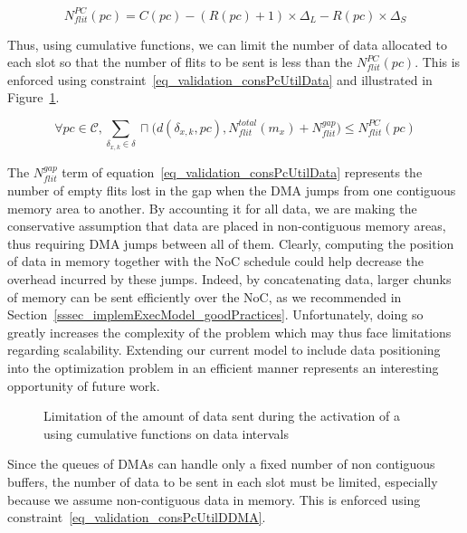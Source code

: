\documentclass[main.tex]{subfiles}
\begin{document}
\begin{displaymath}
    N_{flit}^{PC} (pc) = C(pc) - (R(pc) + 1) \times \Delta_L - R(pc)\times \Delta_S 
\end{displaymath}

Thus, using cumulative functions, we can limit the number of data allocated to
each \PC{} slot so that the number of flits to be sent is less than the
$N_{flit}^{PC} (pc)$. This is enforced using
constraint~\ref{eq_validation_consPcUtilData} and illustrated in
Figure~\ref{fig_validation_consPcUtilData}. 

\begin{equation}
    \label{eq_validation_consPcUtilData}
    \forall pc \in \mathcal{C} , 
    \sum_{\delta_{x,k} \in \delta} \sqcap \Big( d(\delta_{x,k} , pc) , N_{flit}^{total}(m_x) + N_{flit}^{gap} \Big) \leq N_{flit}^{PC} (pc)
\end{equation}

The $N_{flit}^{gap}$ term of equation~\ref{eq_validation_consPcUtilData}
represents the number of empty flits lost in the gap when the DMA jumps from
one contiguous memory area to another. By accounting it for all data, we are
making the conservative assumption that data are placed in non-contiguous
memory areas, thus requiring DMA jumps between all of them. Clearly, computing
the position of data in memory together with the NoC schedule could help
decrease the overhead incurred by these jumps. Indeed, by concatenating data,
larger chunks of memory can be sent efficiently over the NoC, as we recommended
in Section~\ref{sssec_implemExecModel_goodPractices}.
Unfortunately, doing so greatly increases the complexity of the problem which
may thus face limitations regarding scalability. Extending our current model to
include data positioning into the optimization problem in an efficient manner
represents an interesting opportunity of future work.

\begin{figure}
    \centering
    \scalebox{0.9}{}
    \caption{Limitation of the amount of data sent during the activation of a
    \PC{} using cumulative functions on data intervals}
    \label{fig_validation_consPcUtilData}
\end{figure}

Since the queues of DMAs can handle only a fixed number of non contiguous
buffers, the number of data to be sent in each \PC{} slot must be limited,
especially because we assume non-contiguous data in memory. This is enforced
using constraint~\ref{eq_validation_consPcUtilDDMA}.
\end{document}
